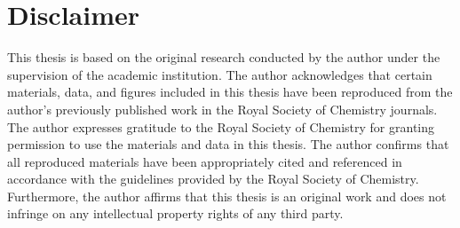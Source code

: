\chapter*{Disclaimer}

This thesis is based on the original research conducted by the author under the supervision of the academic institution. The author acknowledges that certain materials, data, and figures included in this thesis have been reproduced from the author's previously published work in the Royal Society of Chemistry journals\cite{my_paper}. The author expresses gratitude to the Royal Society of Chemistry for granting permission to use the materials and data in this thesis. The author confirms that all reproduced materials have been appropriately cited and referenced in accordance with the guidelines provided by the Royal Society of Chemistry. Furthermore, the author affirms that this thesis is an original work and does not infringe on any intellectual property rights of any third party.
    